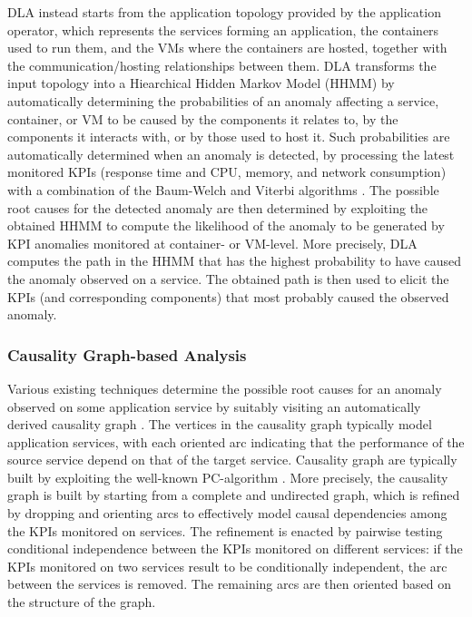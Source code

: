 DLA \cite{14_Samir2019_DLA} instead starts from the application topology provided by the application operator, which represents the services forming an application, the containers used to run them, and the VMs where the containers are hosted, together with the communication/hosting relationships between them.
DLA \cite{14_Samir2019_DLA} transforms the input topology into a Hiearchical Hidden Markov Model (HHMM) \cite{Capp2010_HiddenMarkovModels} by automatically determining the probabilities of an anomaly affecting a service, container, or VM to be caused by the components it relates to, \viz by the components it interacts with, or by those used to host it.
Such probabilities are automatically determined when an anomaly is detected, by processing the latest monitored KPIs (\viz response time and CPU, memory, and network consumption) with a combination of the Baum-Welch and Viterbi algorithms \cite{Capp2010_HiddenMarkovModels}.
The possible root causes for the detected anomaly are then determined by exploiting the obtained HHMM to compute the likelihood of the anomaly to be generated by KPI anomalies monitored at container- or VM-level. More precisely, DLA computes the path in the HHMM that has the highest probability to have caused the anomaly observed on a service. 
The obtained path is then used to elicit the KPIs (and corresponding components) that most probably caused the observed anomaly.

\subsubsection{{Causality Graph-based Analysis}}
Various existing techniques determine the possible root causes for an anomaly observed on some application service by suitably visiting an automatically derived causality graph \cite{40_Chen2020_CauseInfer,48_Chen2014_CauseInfer,06_Lin2018_Microscope,19_Guan2019_MicroscopeDemo,44_Lin2018_FacGraph,07_Ma2019_MSRank,25_Ma2020_MSRankExtended,08_Ma2020_AutoMAP,29_Wang2018_CloudRanger}.
The vertices in the causality graph typically model application services, with each oriented arc indicating that the performance of the source service depend on that of the target service.
Causality graph are typically built by exploiting the well-known PC-algorithm \cite{Spirtes2000_CausationPredictionSearchPCAlgoritm}.
More precisely, the causality graph is built by starting from a complete and undirected graph, which is refined by dropping and orienting arcs to effectively model causal dependencies among the KPIs monitored on services. 
The refinement is enacted by pairwise testing conditional independence between the KPIs monitored on different services: if the KPIs monitored on two services result to be conditionally independent, the arc between the services is removed. 
The remaining arcs are then oriented based on the structure of the graph.


